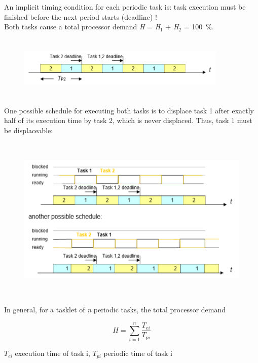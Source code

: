An implicit timing condition for each periodic task is: task execution must be finished before the next period starts (deadline) !\\

Both tasks cause a total processor demand \textit{H} = \textit{H}${}_{1}$ + \textit{H}${}_{2}$ = 100~\%.

	\begin{figure}[h]
    \centering
    \includegraphics[width=10cm, height=3cm]{Images/image85.png}
    \label{fig:Fig 31}
    \end{figure} 
    
One possible schedule for executing both tasks is to displace task 1 after exactly half of its execution time by task 2, which is never displaced. Thus, task 1 must be displaceable:

	\begin{figure}[h]
    \centering
    \includegraphics[width=12cm, height=8cm]{Images/image86.png}
    \label{fig:Fig 32}
    \end{figure} 

In general, for a tasklet of \textit{n} periodic tasks, the total processor demand

\begin{equation}
	H=\sum _{i=1}^{n}\frac{T_{ei} }{T_{pi}}
\label{EQ 3}
\end{equation}

$T_{ei}$ execution time of task i, $T_{pi}$ periodic time of task i\\
\newpage

